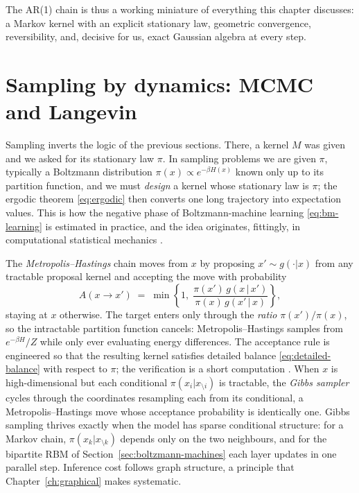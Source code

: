 The AR(1) chain is thus a working miniature of everything this chapter
discusses: a Markov kernel with an explicit stationary law, geometric
convergence, reversibility, and, decisive for us, exact Gaussian algebra
at every step.

\section{Sampling by dynamics: MCMC and Langevin}\label{sec:mcmc}

Sampling inverts the logic of the previous sections. There, a kernel $M$
was given and we asked for its stationary law $\pi$. In sampling problems
we are given $\pi$, typically a Boltzmann distribution
$\pi(x) \propto e^{-\beta H(x)}$ known only up to its partition function,
and we must \emph{design} a kernel whose stationary law is $\pi$; the
ergodic theorem \eqref{eq:ergodic} then converts one long trajectory into
expectation values. This is how the negative phase of Boltzmann-machine
learning \eqref{eq:bm-learning} is estimated in practice, and the idea
originates, fittingly, in computational statistical mechanics
\citep{metropolis1953equation}.

The \emph{Metropolis--Hastings} chain \citep{metropolis1953equation,
hastings1970monte} moves from $x$ by proposing $x' \sim g(\cdot|x)$ from
any tractable proposal kernel and accepting the move with probability
\begin{equation}
  A(x \to x') \;=\; \min\!\left\{ 1,\;
    \frac{\pi(x')\, g(x \,|\, x')}{\pi(x)\, g(x' \,|\, x)}
  \right\},
  \label{eq:mh-acceptance}
\end{equation}
staying at $x$ otherwise. The target enters only through the \emph{ratio}
$\pi(x')/\pi(x)$, so the intractable partition function cancels:
Metropolis--Hastings samples from $e^{-\beta H}/Z$ while only ever
evaluating energy differences. The acceptance rule is engineered so that
the resulting kernel satisfies detailed balance
\eqref{eq:detailed-balance} with respect to $\pi$; the verification is a
short computation \citep[Chapter~7]{robert2004monte}. When $x$ is
high-dimensional but each conditional $\pi(x_i | x_{\setminus i})$ is
tractable, the \emph{Gibbs sampler} \citep{geman1984stochastic} cycles
through the coordinates resampling each from its conditional, a
Metropolis--Hastings move whose acceptance probability is identically
one. Gibbs sampling thrives exactly when the model has sparse conditional
structure: for a Markov chain, $\pi(x_k | x_{\setminus k})$ depends only
on the two neighbours, and for the bipartite RBM of
Section~\ref{sec:boltzmann-machines} each layer updates in one parallel
step. Inference cost follows graph structure, a principle that
Chapter~\ref{ch:graphical} makes systematic.

